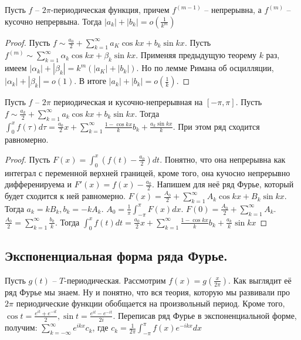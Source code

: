 \documentclass[document.tex]{subfiles}
\begin{document}
\begin{definition}
    Пусть $f$ -- $2 \pi$-периодическая функция, причем $f^{(m - 1)}$ -- непрерывна, а $f^{(m)}$ -- кусочно непрервына.
    Тогда $|a_k| + |b_k| = o(\frac{1}{k^m})$
\end{definition}

\begin{proof}
    Пусть $f \sim \frac{a_0}{2} + \sum_{k = 1}^{\infty} a_K \cos kx + b_k \sin kx$. Пусть $f^{(m)} \sim \sum_{k =
    1}^{\infty} \alpha_k \cos kx + \beta_k \sin kx$. Применяя предыдущую теорему $k$ раз, имеем $|\alpha_k| + |\beta_k|
    = k^m(|a_K| + |b_k|)$. Но по лемме Римана об осцилляции, $|\alpha_k| + |\beta_k| = o(1)$. В итоге $|a_k| + |b_k| =
    o(\frac{1}{k})$.
\end{proof}

\begin{theorem}
    Пусть $f$ -- $2 \pi$ периодическая и кусочно-непрерывная на $[-\pi, \pi]$. Пусть $f \sim \frac{a_k}{2} + \sum_{k =
    1}^{\infty} a_k \cos kx + b_k \sin kx$. Тогда $\int_{0}^{x}f(\tau)d\tau = \frac{a_0}{2}x + \sum_{k = 1}^{\infty}
    \frac{1 - \cos kx}{k}b_k + \frac{a_k \sin kx}{k}$. При этом ряд сходится равномерно.
\end{theorem}

\begin{proof}
    Пусть $F(x) = \int_{0}^{x}(f(t) - \frac{a_0}{2})dt$. Понятно, что она непрерывна как интеграл с переменной верхней
    границей, кроме того, она кучосно непрерывно дифференируема и $F'(x) = f(x) - \frac{a_0}{2}$. Напишем для неё ряд
    Фурье, который будет сходится к ней равномерно. $F(x) = \frac{A_0}{2} + \sum_{k = 1}^{\infty} A_k \cos kx + B_k \sin
    kx$. Тогда $a_k = k B_k, b_k = -kA_k$. $A_0 = \frac{1}{\pi}\int_{-\pi}^{\pi}F(x)dx$. $F(0) = \frac{A_0}{2} + \sum_{k
    = 1}^{\infty}A_k$. $\frac{A_0}{2} = \sum_{k = 1}^{\infty}\frac{b_k}{k}$. Тогда $\int_{0}^{x}f(t)dt =
    \frac{a_0}{2}x + \sum_{k = 1}^{\infty}\frac{1 - \cos kx}{k}b_k + \frac{a_k}{k} \sin kx$
\end{proof}

\subsection{Экспоненциальная форма ряда Фурье.}

Пусть $g(t)$ -- $T$-периодическая. Рассмотрим $f(x) = g(\frac{x}{2 \pi})$. Как выглядит её ряд Фурье мы знаем. Ну и
понятно, что вся теория, которую мы развивали про $2 \pi$ периодические функции обобщается на произвольный период. Кроме
того, $\cos t = \frac{e^{it} + e^{-it}}{2}, \sin t = \frac{e^{it} - e^{-it}}{2i}$. Переписав ряд Фурье в
экспоненциальной форме, получим: $\sum_{k = -\infty}^{\infty}e^{ikx}c_k$, где $c_k = \frac{1}{2\pi}\int_{-\pi}^{\pi}f(x) e^{-ikx}dx$
\end{document}
